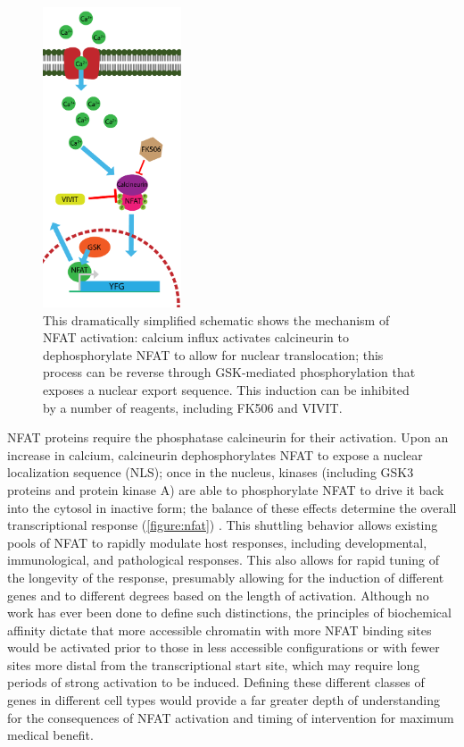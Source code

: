 \begin{figure}
\centering
\includegraphics[height=3.5in]{images/nfatact.pdf}
\caption{This dramatically simplified schematic shows the mechanism of NFAT activation: calcium influx activates calcineurin to dephosphorylate NFAT to allow for nuclear translocation; this process can be reverse through GSK-mediated phosphorylation that exposes a nuclear export sequence. This induction can be inhibited by a number of reagents, including FK506 and VIVIT.}
\label{figure:nfat}
\end{figure}

NFAT proteins require the phosphatase calcineurin for their activation. Upon an increase in calcium, calcineurin dephosphorylates NFAT to expose a nuclear localization sequence (NLS); once in the nucleus, kinases (including GSK3 proteins and protein kinase A) are able to phosphorylate NFAT to drive it back into the cytosol in inactive form; the balance of these effects determine the overall transcriptional response (\autoref{figure:nfat}) \citep{Crabtree2002}. This shuttling behavior allows existing pools of NFAT to rapidly modulate host responses, including developmental, immunological, and pathological responses. This also allows for rapid tuning of the longevity of the response, presumably allowing for the induction of different genes and to different degrees based on the length of activation. Although no work has ever been done to define such distinctions, the principles of biochemical affinity dictate that more accessible chromatin with more NFAT binding sites would be activated prior to those in less accessible configurations or with fewer sites more distal from the transcriptional start site, which may require long periods of strong activation to be induced. Defining these different classes of genes in different cell types would provide a far greater depth of understanding for the consequences of NFAT activation and timing of intervention for maximum medical benefit.

